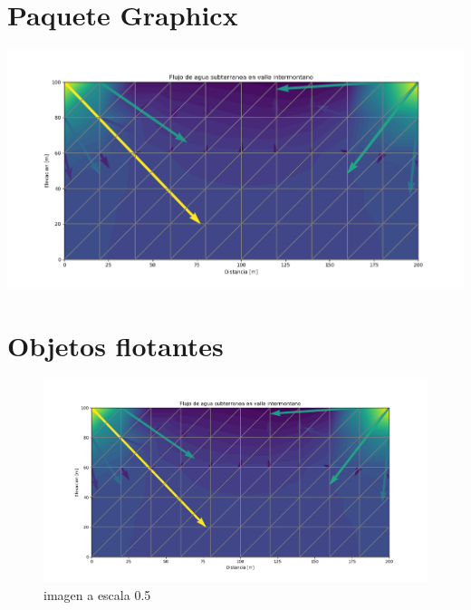 \section{Paquete Graphicx}
\begin{center}

\includegraphics[scale=0.5]{Figure_2.png}

\end{center}

\section{Objetos flotantes}

\begin{figure}[!ht]
\centering 
\includegraphics[scale=0.5]{Figure_2.png}
\caption{imagen a escala 0.5}
\label{figura1}
\end{figure}
